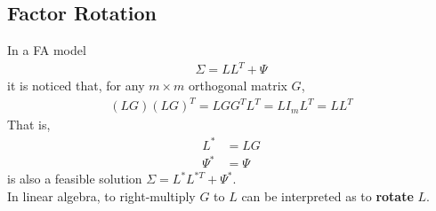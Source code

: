 \documentclass[12pt]{extarticle}
\newcommand{\<}{\langle}
\renewcommand{\>}{\rangle}
\theoremstyle{definition}
\begin{document}
\newpage
\subsection{Factor Rotation}
In a FA model
\begin{align*}
    \Sigma = LL^T +\Psi
\end{align*}
it is noticed that, for any $m\times m$ orthogonal matrix $G$,
\begin{align*}
    (LG)(LG)^T =LGG^T L^T = LI_m L^T = LL^T
\end{align*}
That is,
\begin{align*}
    L^* &= LG\\
    \Psi^* &= \Psi
\end{align*}
is also a feasible solution $\Sigma = L^*L^{*T} +\Psi^*$.\\
In linear algebra, to right-multiply $G$ to $L$ can be interpreted as to \textbf{rotate} $L$.\\
\end{document}
